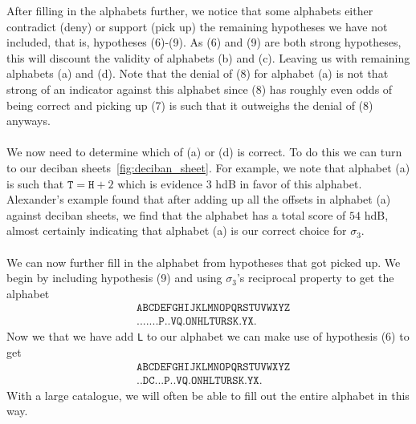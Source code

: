   \noindent  After filling in the alphabets further, we notice that
  some alphabets either contradict (deny) or support (pick up) the
  remaining hypotheses we have not included, that is, hypotheses
  (6)-(9). As (6) and (9) are both strong hypotheses, this will
  discount the validity of alphabets (b) and (c). Leaving us with
  remaining alphabets (a) and (d). Note that the denial of (8) for
  alphabet (a) is not that strong of an indicator against this
  alphabet since (8) has roughly even odds of being correct and
  picking up (7) is such that it outweighs the denial of (8) anyways.
  \\\\We now need to determine which of (a) or (d) is correct. To do
  this we can turn to our deciban sheets~\ref{fig:deciban_sheet}. For
  example, we note that alphabet (a) is such that $\texttt{T} =
  \texttt{H} + 2$ which is evidence $3$ hdB in favor of this
  alphabet. Alexander's example found that after adding up all the
  offsets in alphabet (a) against deciban sheets, we find that the
  alphabet has a total score of $54$ hdB, almost certainly indicating
  that alphabet (a) is our correct choice for $\sigma_3$.
  \\\\We can now further fill in the alphabet from hypotheses that
  got picked up. We begin by including hypothesis (9) and using
  $\sigma_3$'s reciprocal property to get the alphabet
  \begin{align*}
    & \texttt{ABCDEFGHIJKLMNOPQRSTUVWXYZ} \\
    & \texttt{.......P..VQ.ONHLTURSK.YX.}
  \end{align*}
  Now we that we have add \texttt{L} to our alphabet we can make use
  of hypothesis (6) to get
  \begin{align*}
    & \texttt{ABCDEFGHIJKLMNOPQRSTUVWXYZ} \\
    & \texttt{..DC...P..VQ.ONHLTURSK.YX.}
  \end{align*}
  With a large catalogue, we will often be able to fill out the
  entire alphabet in this way.

